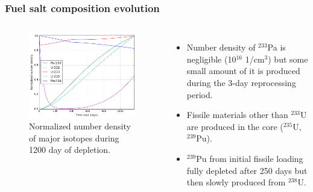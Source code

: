 \begin{frame}
  \frametitle{Fuel salt composition evolution}
    \begin{columns}
    \column[t]{7cm}
   \vspace{-0.35in}
  \begin{figure}[t]
   \hspace*{-0.15in}
   \includegraphics[height=0.75\textheight]{./images/fuel_composition.png}
   \vspace{-0.05in}
   \caption{Normalized number density of major isotopes during 1200 day of depletion.}
    \end{figure}

    \column[t]{5cm}
       \begin{itemize}
        \item Number density of $^{233}$Pa is negligible (10$^{16}$ 1/cm$^3$) but some small amount of it is produced
during the 3-day reprocessing period. 
   		\item Fissile materials other than $^{233}$U are produced in the core ($^{235}$U, $^{239}$Pu).
   		\item $^{239}$Pu from initial fissile loading fully depleted after 250 days but then slowly produced from $^{238}$U.
       \end{itemize}
     \end{columns}
\end{frame}

